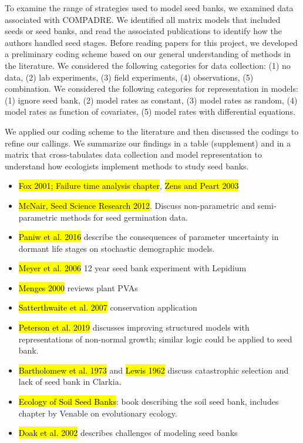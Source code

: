 \documentclass[12pt, oneside, titlepage]{article}   	%
\begin{document}
To examine the range of strategies used to model seed banks, we examined data associated with COMPADRE. We identified all matrix models that included seeds or seed banks, and read the associated publications to identify how the authors handled seed stages. Before reading papers for this project, we developed a preliminary coding scheme based on our general understanding of methods in the literature. We considered the following categories for data collection: (1) no data, (2) lab experiments, (3) field experiments, (4) observations, (5) combination. We considered the following categories for representation in models: (1) ignore seed bank, (2) model rates as constant, (3) model rates as random, (4) model rates as function of covariates, (5) model rates with differential equations.

We applied our coding scheme to the literature and then discussed the codings to refine our callings. We summarize our findings in a table (supplement) and in a matrix that cross-tabulates data collection and model representation to understand how ecologists implement methods to study seed banks.

\singlespace
\begin{itemize}

\item \hl{Fox 2001; Failure time analysis chapter}, \hl{Zens and Peart 2003}

\item \hl{McNair, Seed Science Research 2012}. Discuss non-parametric and semi-parametric methods for seed germination data.

\item \hl{Paniw et al. 2016} describe the consequences of parameter uncertainty in dormant life stages on stochastic demographic models.

\item \hl{Meyer et al. 2006} 12 year seed bank experiment with Lepidium

\item \hl{Menges 2000} reviews plant PVAs

\item \hl{Satterthwaite et al. 2007} conservation application

\item \hl{Peterson et al. 2019} discusses improving structured models with representations of non-normal growth; similar logic could be applied to seed bank.

\item \hl{Bartholomew et al. 1973} and \hl{Lewis 1962} discuss catastrophic selection and lack of seed bank in Clarkia. 

\item \hl{Ecology of Soil Seed Banks}: book describing the soil seed bank, includes chapter by Venable on evolutionary ecology.

\item \hl{Doak et al. 2002} describes challenges of modeling seed banks

\end{itemize}
\doublespace
\end{document}

